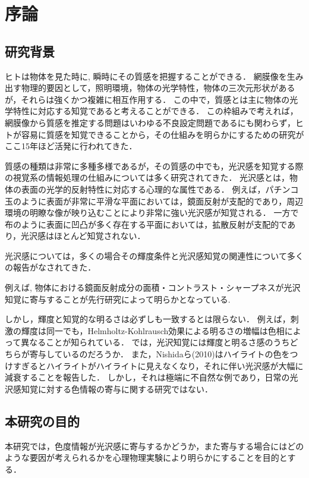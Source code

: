 \chapter{序論}
    \section{研究背景}
        ヒトは物体を見た時に, 瞬時にその質感を把握することができる．
        網膜像を生み出す物理的要因として，照明環境，物体の光学特性，物体の三次元形状があるが，それらは強くかつ複雑に相互作用する．
        この中で，質感とは主に物体の光学特性に対応する知覚であると考えることができる．
        この枠組みで考えれば，網膜像から質感を推定する問題はいわゆる不良設定問題であるにも関わらず，ヒトが容易に質感を知覚できることから，その仕組みを明らかにするための研究がここ15年ほど活発に行われてきた．

        質感の種類は非常に多種多様であるが\cite{Material}，その質感の中でも，光沢感を知覚する際の視覚系の情報処理の仕組みについては多く研究されてきた．
        光沢感とは，物体の表面の光学的反射特性に対応する心理的な属性である．
        例えば，パチンコ玉のように表面が非常に平滑な平面においては，鏡面反射が支配的であり，周辺環境の明瞭な像が映り込むことにより非常に強い光沢感が知覚される．
        一方で布のように表面に凹凸が多く存在する平面においては，拡散反射が支配的であり，光沢感はほとんど知覚されない．

        光沢感については，多くの場合その輝度条件と光沢感知覚の関連性について多くの報告がなされてきた．\cite{}

        例えば, 物体における鏡面反射成分の面積・コントラスト・シャープネスが光沢知覚に寄与することが先行研究によって明らかとなっている.\cite{Phillip}

        しかし，輝度と知覚的な明るさは必ずしも一致するとは限らない．
        例えば，刺激の輝度は同一でも，Helmholtz-Kohlrausch効果による明るさの増幅は色相によって異なることが知られている．
        では，光沢知覚には輝度と明るさ感のうちどちらが寄与しているのだろうか．
        また，Nishidaら(2010)はハイライトの色をつけすぎるとハイライトがハイライトに見えなくなり，それに伴い光沢感が大幅に減衰することを報告した．\cite{Nishida}
        しかし，それは極端に不自然な例であり，日常の光沢感知覚に対する色情報の寄与に関する研究ではない．


    \section{本研究の目的}
        本研究では，色度情報が光沢感に寄与するかどうか，また寄与する場合にはどのような要因が考えられるかを心理物理実験により明らかにすることを目的とする．

